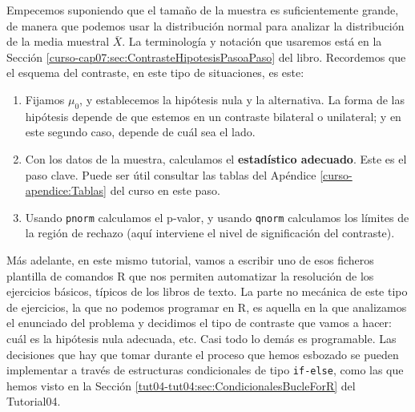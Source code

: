 \documentclass[10pt,a4paper]{article}\usepackage[]{graphicx}\usepackage[]{color}
\newcounter {cont01}
\begin{document}
Empecemos suponiendo que el tamaño de la muestra es suficientemente grande, de manera que podemos usar la distribución normal para analizar la distribución de la media muestral $\bar X$. La terminología y notación que usaremos está en la Sección \ref{curso-cap07:sec:ContrasteHipotesisPasoaPaso} del libro. Recordemos que el esquema del contraste, en este tipo de situaciones, es este:
\begin{enumerate}
  \item Fijamos $\mu_0$, y establecemos la hipótesis nula y la alternativa. La forma de las
      hipótesis depende de que estemos en un contraste bilateral o unilateral; y en este segundo
      caso, depende de cuál sea el lado.
  \item Con los datos de la muestra, calculamos el {\bf estadístico adecuado}. Este es el paso
      clave. Puede ser útil consultar las tablas del Apéndice \ref{curso-apendice:Tablas} del
      curso en este paso.
  \item Usando {\tt pnorm} calculamos el p-valor, y usando {\tt qnorm} calculamos los límites de
      la región de rechazo (aquí interviene el nivel de significación del contraste).
\end{enumerate}
Más adelante, en este mismo tutorial, vamos a escribir uno de esos ficheros plantilla de comandos R que nos permiten automatizar la resolución de los ejercicios básicos, típicos de los libros de texto. La parte no mecánica de este tipo de ejercicios, la que no podemos programar en R, es aquella en la que analizamos el enunciado del problema y decidimos el tipo de contraste que vamos a hacer: cuál es la hipótesis nula adecuada, etc. Casi todo lo demás es programable. Las decisiones que hay que tomar durante el proceso que hemos esbozado se pueden implementar a través de
estructuras condicionales de tipo {\tt if-else}, como las que hemos visto en la Sección
\ref{tut04-tut04:sec:CondicionalesBucleForR} del Tutorial04.
\end{document}
